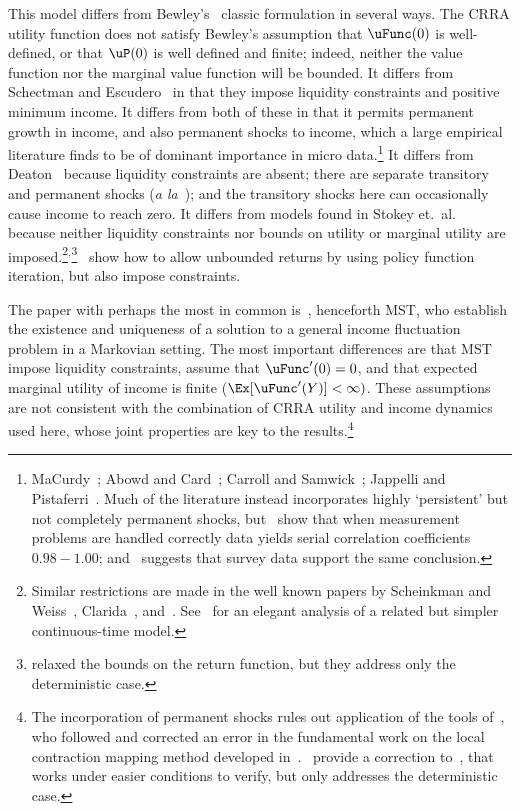 \documentclass[ProjectDLO]{subfiles}
\begin{document}
\hypertarget{DiffFromLit}{} This model differs from Bewley's~\citeyearpar{bewleyPIH} classic formulation in several ways. The CRRA utility function does not satisfy Bewley's assumption that $\uFunc(0)$ is well-defined, or that $\uP(0)$ is well defined and finite; indeed, neither the value function nor the marginal value function will be bounded.  It differs from Schectman and Escudero~\citeyearpar{seIncFluct} in that they impose liquidity constraints and positive minimum income.  It differs from both of these in that it permits permanent growth in income, and also permanent shocks to income, which a large empirical literature finds to be of dominant importance in micro data.\footnote{MaCurdy~\citeyearpar{macurdyTimeseries}; Abowd and Card~\citeyearpar{acCovariance}; Carroll and Samwick~\citeyearpar{csNature}; Jappelli and Pistaferri~\citeyearpar{jpCins}.  Much of the literature instead incorporates highly `persistent' but not completely permanent shocks, but~\cite{dhmImproving} show that when measurement problems are handled correctly data yields serial correlation coefficients $0.98-1.00$; and~\cite{dmHowMuch} suggests that survey data support the same conclusion.}  It differs from Deaton~\citeyearpar{deatonLiqConstr} because liquidity constraints are absent; there are separate transitory and permanent shocks (\textit{a la}~\cite{muthOptimal}); and the transitory shocks here can occasionally cause income to reach zero.%
It differs from models found in Stokey et.\ al.~\citeyearpar{slpMethods} because neither liquidity constraints nor bounds on utility or marginal utility are imposed.\footnote{Similar restrictions are made in the well known papers by Scheinkman and Weiss~\citeyearpar{scheinkman&weiss:borrowing}, Clarida~\citeyearpar{claridaErgodic}, and~\cite{cwcUnderUncert}.  See~\cite{tocheUrisk} for an elegant analysis of a related but simpler continuous-time model.}$^{,}$\footnote{\cite{asHomogeneous} relaxed the bounds on the return function, but they address only the deterministic case.}~\cite{lsIncFluct} show how to allow unbounded returns by using policy function iteration, but also impose constraints.

The paper with perhaps the most in common is~\cite{mstIncFluct}, henceforth MST, who establish the existence and uniqueness of a solution to a general income fluctuation problem in a Markovian setting.  The most important differences are that MST impose liquidity constraints, assume that $\uFunc^{\prime}(0)=0$, and that expected marginal utility of income is finite ($\Ex[\uFunc^{\prime}(Y)]<\infty)$.  These assumptions are not consistent with the combination of CRRA utility and income dynamics used here, whose joint properties are key to the results.\footnote{The incorporation of permanent shocks rules out application of the tools of~\cite{mnUnique}, who followed and corrected an error in the fundamental work on the local contraction mapping method developed in~\cite{rrExistence}.\@~\cite{mvExistence} provide a correction to~\cite{rrExistence}, that works under easier conditions to verify, but only addresses the deterministic case.}
\end{document}
